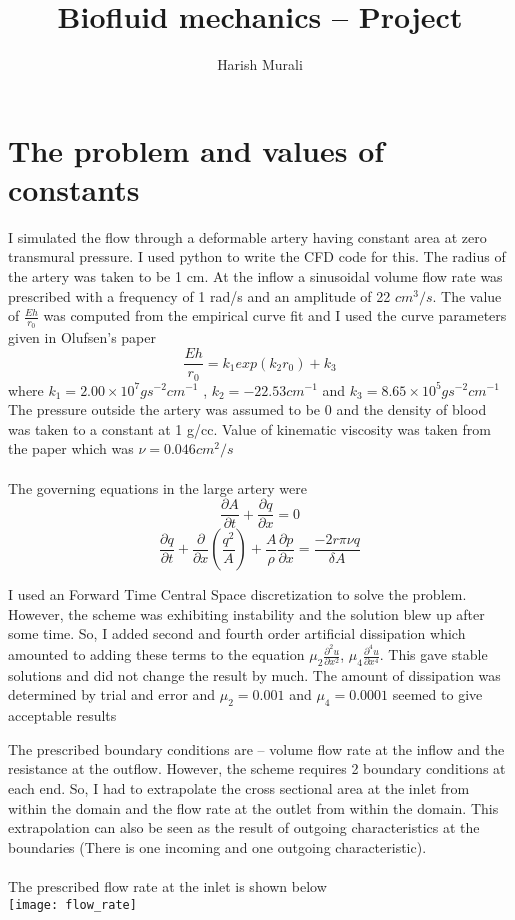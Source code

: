 \documentclass{report}
\author{Harish Murali}
\title{Biofluid mechanics -- Project}
\begin{document}
\maketitle
\newpage
\section*{The problem and values of constants}
I simulated the flow through a deformable artery having constant area at zero transmural pressure. I used python to write the CFD code for this. The radius of the artery was taken to be 1 cm. At the inflow a sinusoidal volume flow rate was prescribed with a frequency of 1 rad/s and an amplitude of 22 $cm^3/s$. The value of $\frac{Eh}{r_0}$ was computed from the empirical curve fit and I used the curve parameters given in Olufsen's paper
\begin{equation}
	\frac{Eh}{r_0} = k_1exp(k_2r_0) + k_3
\end{equation}
where $k_1 = 2.00 \times 10^7 gs^{-2}cm^{-1}$ , $k_2 = -22.53 cm^{-1}$ and $k_3 = 8.65 \times 10^5 gs^{-2}cm^{-1}$
The pressure outside the artery was assumed to be 0 and the density of blood was taken to a constant at 1 g/cc. Value of kinematic viscosity was taken from the paper which was $\nu = 0.046 cm^2/s$
\\~\\
The governing equations in the large artery were
\begin{equation}
	\frac{\partial A}{\partial t} + \frac{\partial q}{\partial x} = 0
\end{equation}
\begin{equation}
	\frac{\partial q}{\partial t} + \frac{\partial}{\partial x}(\frac{q^2}{A})+ \frac{A}{\rho}\frac{\partial p}{\partial x} = \frac{-2r\pi\nu q}{\delta A}
\end{equation}

I used an Forward Time Central Space discretization to solve the problem. However, the scheme was exhibiting instability and the solution blew up after some time. So, I added second and fourth order artificial dissipation which amounted to adding these terms to the equation $\mu_2\frac{\partial^2 u}{\partial x^2}$, $\mu_4\frac{\partial^4 u}{\partial x^4}$. This gave stable solutions and did not change the result by much. The amount of dissipation was determined by trial and error and $\mu_2 = 0.001$ and $\mu_4 = 0.0001$ seemed to give acceptable results

The prescribed boundary conditions are -- volume flow rate at the inflow and the resistance at the outflow. However, the scheme requires 2 boundary conditions at each end. So, I had to extrapolate the cross sectional area at the inlet from within the domain and the flow rate at the outlet from within the domain. This extrapolation can also be seen as the result of outgoing characteristics at the boundaries (There is one incoming and one outgoing characteristic).
\\~\\
The prescribed flow rate at the inlet is shown below\\
\texttt{[image: flow\_rate]}
\end{document}
